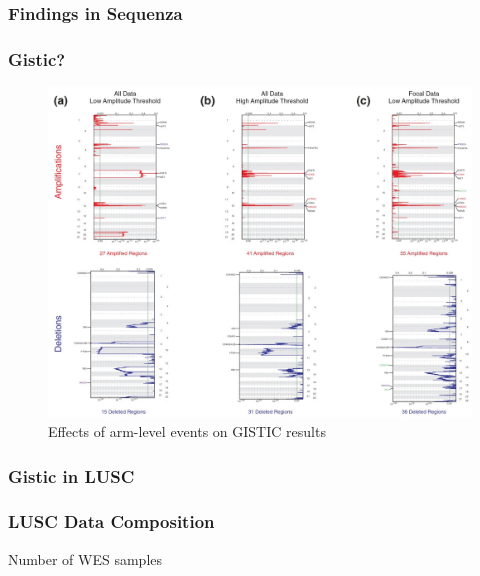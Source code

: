 \documentclass{beamer}
\begin{document}
    \begin{frame}
        \frametitle{Findings in Sequenza}
    \end{frame}

    \begin{frame}
        \frametitle{Gistic?}

        \begin{figure}
            \includegraphics[width=0.6 \linewidth]{figures/Workflow/Gistic.jpg}
            \caption{Effects of arm-level events on GISTIC results \protect\cite{gistic-1}}
        \end{figure}
    \end{frame}

    \subsubsection{Gistic in LUSC}
    \begin{frame}
        \frametitle{LUSC Data Composition}

        \begin{table}
            \caption{Number of WES samples}
            \resizebox{!}{0.3 \textheight}
            {}
        \end{table}
    \end{frame}
\end{document}
